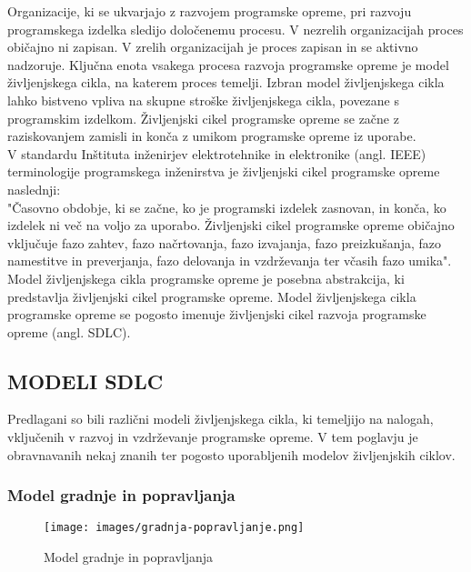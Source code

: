 \documentclass[a4paper,12pt,openright]{book}
\begin{document}
Organizacije, ki se ukvarjajo z razvojem programske opreme, pri razvoju programskega izdelka sledijo določenemu procesu. V nezrelih organizacijah proces običajno ni zapisan. V zrelih organizacijah je proces zapisan in se aktivno nadzoruje. Ključna enota vsakega procesa razvoja programske opreme je model življenjskega cikla, na katerem proces temelji. Izbran model življenjskega cikla lahko bistveno vpliva na skupne stroške življenjskega cikla, povezane s programskim izdelkom. Življenjski cikel programske opreme se začne z raziskovanjem zamisli in konča z umikom programske opreme iz uporabe. \\
V standardu Inštituta inženirjev elektrotehnike in elektronike (angl. IEEE) terminologije programskega inženirstva je življenjski cikel programske opreme naslednji: \\
"Časovno obdobje, ki se začne, ko je programski izdelek zasnovan, in konča, ko izdelek ni več na voljo za uporabo. Življenjski cikel programske opreme običajno vključuje fazo zahtev, fazo načrtovanja, fazo izvajanja, fazo preizkušanja, fazo namestitve in preverjanja, fazo delovanja in vzdrževanja ter včasih fazo umika". \\
Model življenjskega cikla programske opreme je posebna abstrakcija, ki predstavlja življenjski cikel programske opreme. Model življenjskega cikla programske opreme se pogosto imenuje življenjski cikel razvoja programske opreme (angl. SDLC). \cite{aggarwal2005software}
\subsection{MODELI SDLC}

Predlagani so bili različni modeli življenjskega cikla, ki temeljijo na nalogah, vključenih v razvoj in vzdrževanje programske opreme. V tem poglavju je obravnavanih nekaj znanih ter pogosto uporabljenih modelov življenjskih ciklov.
\subsubsection{Model gradnje in popravljanja}
\begin{figure}[H]
    \centering
    \texttt{[image: images/gradnja-popravljanje.png]}
    \caption{Model gradnje in popravljanja}
    \label{fig:gradnja}
\end{figure}
\end{document}
